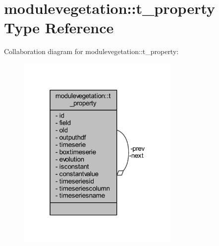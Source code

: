 \hypertarget{structmodulevegetation_1_1t__property}{}\section{modulevegetation\+:\+:t\+\_\+property Type Reference}
\label{structmodulevegetation_1_1t__property}


Collaboration diagram for modulevegetation\+:\+:t\+\_\+property\+:\nopagebreak
\begin{figure}[H]
\begin{center}
\leavevmode
\includegraphics[width=223pt]{structmodulevegetation_1_1t__property__coll__graph}
\end{center}
\end{figure}
